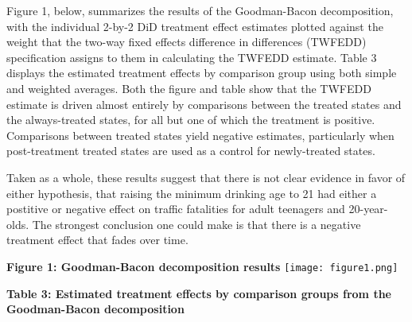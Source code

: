 \documentclass{article}
\begin{document}
Figure 1, below, summarizes the results of the Goodman-Bacon decomposition, with the individual 2-by-2 DiD treatment effect estimates plotted against the weight that the two-way fixed effects difference in differences (TWFEDD) specification assigns to them in calculating the TWFEDD estimate. Table 3 displays the estimated treatment effects by comparison group using both simple and weighted averages. Both the figure and table show that the TWFEDD estimate is driven almost entirely by comparisons between the treated states and the always-treated states, for all but one of which the treatment is positive. Comparisons between treated states yield negative estimates, particularly when post-treatment treated states are used as a control for newly-treated states.

Taken as a whole, these results suggest that there is not clear evidence in favor of either hypothesis, that raising the minimum drinking age to 21 had either a postitive or negative effect on traffic fatalities for adult teenagers and 20-year-olds. The strongest conclusion one could make is that there is a negative treatment effect that fades over time.

\pagebreak
\begin{center}
        \textbf{Figure 1: Goodman-Bacon decomposition results}
        \texttt{[image: figure1.png]}
\end{center}

\begin{center}
        \textbf{Table 3: Estimated treatment effects by comparison groups from the Goodman-Bacon decomposition}
        
\end{center}
\end{document}
